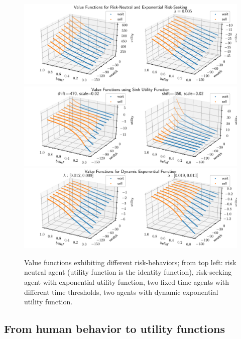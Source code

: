 \begin{figure}[H]
    \centering
    \includegraphics[width=0.98\linewidth]{img/exp_policy.pdf}\\
    \vspace{1cm}
    \includegraphics[width=0.98\linewidth]{img/sinh_policy.pdf}\\
    \vspace{1cm}
    \includegraphics[width=0.98\linewidth]{img/dyn_policy.pdf}
    \caption{Value functions exhibiting different risk-behaviors; from top left: risk neutral agent (utility function is the identity function), risk-seeking agent with exponential utility function, two fixed time agents with different time thresholds, two agents with dynamic exponential utility function.}\label{fig:val-func}
\end{figure}



\subsection{From human behavior to utility functions}


